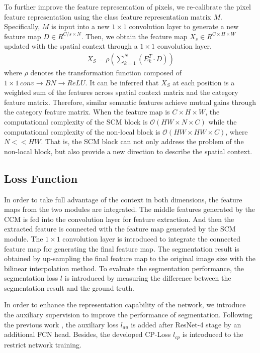 \documentclass[10pt,journal,cspaper,compsoc]{IEEEtran}
\begin{document}
To further improve the feature representation of pixels, we re-calibrate the pixel feature representation using the class feature representation matrix $M$. Specifically, $M$ is input into a new $1\times 1$ convolution layer to generate a new feature map $D\in R^{C/s\times N}$. Then, we obtain the feature map $X_{s}\in R^{C\times H\times W}$ updated with the spatial context through a $1\times 1$ convolution layer.
\begin{align}
X_S = \rho \left( {\sum\nolimits_{k = 1}^N {\left( {E_k^{T} \cdot {D}} \right)} } \right)
\end{align}
where $\rho$ denotes the transformation function composed of $1\times 1 \,conv\rightarrow BN\rightarrow ReLU$. It can be inferred that $X_S$ at each position is a weighted sum of the features across spatial context matrix and the category feature matrix. Therefore, similar semantic features achieve mutual gains through the category feature matrix. When the feature map is $C\times H\times W$, the computational complexity of the SCM block is $\mathcal{O} \left ( HW\times N \times C\right )$ while the computational complexity of the non-local block is $\mathcal{O} \left ( HW\times HW \times C\right )$, where $N << HW$. That is, the SCM block can not only address the problem of the non-local block, but also provide a new direction to describe the spatial context.
	
\subsection{Loss Function}
In order to take full advantage of the context in both dimensions, the feature maps from the two modules are integrated. The middle features generated by the CCM is fed into the convolution layer for feature extraction. And then the extracted feature is connected with the feature map generated by the SCM module. The $1\times 1$ convolution layer is introduced to integrate the connected feature map for generating the final feature map. The segmentation result is obtained by up-sampling the final feature map to the original image size with the bilinear interpolation method. To evaluate the segmentation performance, the segmentation loss $l$ is introduced by measuring the difference between the segmentation result and the ground truth.
	
In order to enhance the representation capability of the network, we introduce the auxiliary supervision to improve the performance of segmentation. Following the previous work \cite{chen2017rethinking, zhang2018context, zhu2019asymmetric}, the auxiliary loss $l_{au}$ is added after ResNet-4 stage by an additional FCN head. Besides, the developed CP-Loss $l_{cp}$ is introduced to the restrict network training.
	
\end{document}
